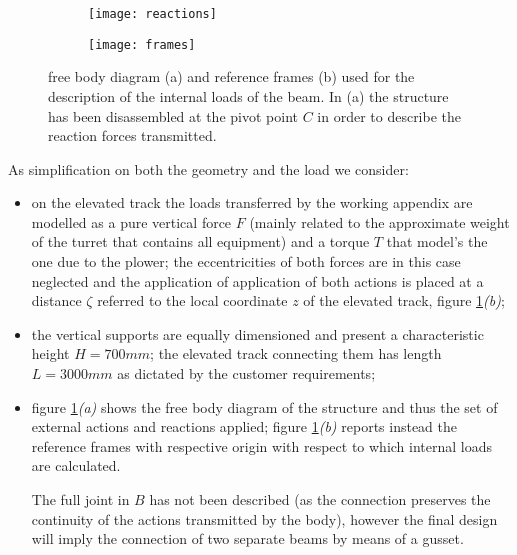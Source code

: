 	
	\begin{figure}[p]
		\begin{subfigure}{\linewidth}			
			\centering \texttt{[image: reactions]} \caption{}
		\end{subfigure}
		\begin{subfigure}{\linewidth}			
			\centering \texttt{[image: frames]} \caption{}
		\end{subfigure}
		\caption{free body diagram (a) and reference frames (b) used for the description of the internal loads of the beam. In (a) the structure has been disassembled at the pivot point $C$ in order to describe the reaction forces transmitted.}
		\label{fig:fbd-frames}
	\end{figure}
	As simplification on both the geometry and the load we consider:
	\begin{itemize}
		\item on the elevated track the loads transferred by the working appendix are modelled as a pure vertical force $F$ (mainly related to the approximate weight of the turret that contains all equipment) and a torque $T$ that model's the one due to the plower; the eccentricities of both forces are in this case neglected and the application of application of both actions is placed at a distance $\zeta$ referred to the local coordinate $z$ of the elevated track, figure \ref{fig:fbd-frames}\textit{\textit{(b)}};
		
		\item the vertical supports are equally dimensioned and present a characteristic height $H = 700mm$; the elevated track connecting them has length $L = 3000mm$ as dictated by the customer requirements;
		
		\item figure \ref{fig:fbd-frames}\textit{(a)} shows the free body diagram of the structure and thus the set of external actions and reactions applied; figure \ref{fig:fbd-frames}\textit{(b)} reports instead the reference frames with respective origin with respect to which internal loads are calculated.
		
		The full joint in $B$ has not been described (as the connection preserves the continuity of the actions transmitted by the body), however the final design will imply the connection of two separate beams by means of a gusset.	
		
	\end{itemize}
	
